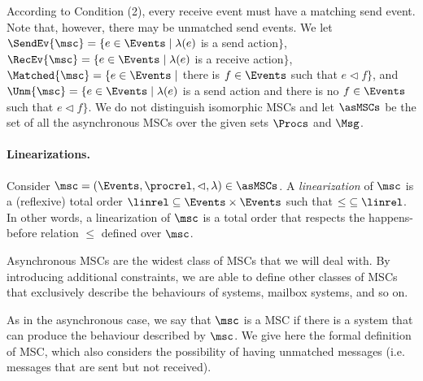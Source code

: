 According to Condition (2), every receive event must have a matching send event. Note that, however, there may be unmatched send events.
We let
$\SendEv{\msc} = \{e \in \Events \mid \lambda(e)$ is a send
action$\}$,
$\RecEv{\msc} = \{e \in \Events \mid \lambda(e)$ is a receive
action$\}$,
$\Matched{\msc} = \{e \in \Events \mid$ there is $f \in \Events$
such that $e \lhd f\}$, and
$\Unm{\msc} = \{e \in \Events \mid \lambda(e)$ is a send
action and there is no $f \in \Events$ such that $e \lhd f\}$.
%
We do not distinguish isomorphic MSCs and
let $\asMSCs$ be the set of all the asynchronous MSCs over the given sets $\Procs$ and $\Msg$.



\paragraph*{Linearizations.}

Consider $\msc = (\Events,\procrel,\lhd,\lambda) \in \asMSCs$.
A \emph{linearization} of $\msc$ is a (reflexive) total order ${\linrel} \subseteq \Events \times \Events$ such that ${\le} \subseteq {\linrel}$. In other words, a linearization of $\msc$ is a total order that respects the happens-before relation $\le$ defined over $\msc$.

\medskip

Asynchronous MSCs are the widest class of MSCs that we will deal with. By introducing additional constraints, we are able to define other classes of MSCs that exclusively describe the behaviours of \pp systems, mailbox systems, and so on.

As in the asynchronous case, we say that $\msc$ is a \pp MSC if there is a \pp system that can produce the behaviour described by $\msc$. We give here the formal definition of \pp MSC, which also considers the possibility of having unmatched messages (i.e. messages that are sent but not received).


